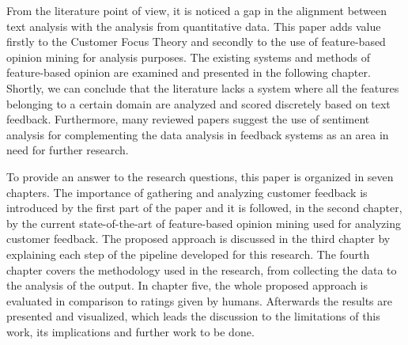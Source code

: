 From the literature point of view, it is noticed a gap in the alignment between text analysis with the analysis from quantitative data. This paper adds value firstly to the Customer Focus Theory and secondly to the use of feature-based opinion mining for analysis purposes. The existing systems and methods of feature-based opinion are examined and presented in the following chapter. Shortly, we can conclude that the literature lacks a system where all the features belonging to a certain domain are analyzed and scored discretely based on text feedback. Furthermore, many reviewed papers\cite{fradkin2016bias,liu2012sentiment,pavlou2006nature,yaakub2012integration,zhang2012weakness,dellarocas2008sound}  suggest the use of sentiment analysis for complementing the data analysis in feedback systems as an area in need for further research.

To provide an answer to the research questions, this paper is organized in seven chapters. The importance of gathering and analyzing customer feedback is introduced by the first part of the paper and it is followed, in the second chapter, by the current state-of-the-art of feature-based opinion mining used for analyzing customer feedback. The proposed approach is discussed in the third chapter by explaining each step of the pipeline developed for this research. The fourth chapter covers the methodology used in the research, from collecting the data to the analysis of the output. In chapter five, the whole proposed approach is evaluated in comparison to ratings given by humans. Afterwards the results are presented and visualized, which leads the discussion to the limitations of this work, its implications and further work to be done. 